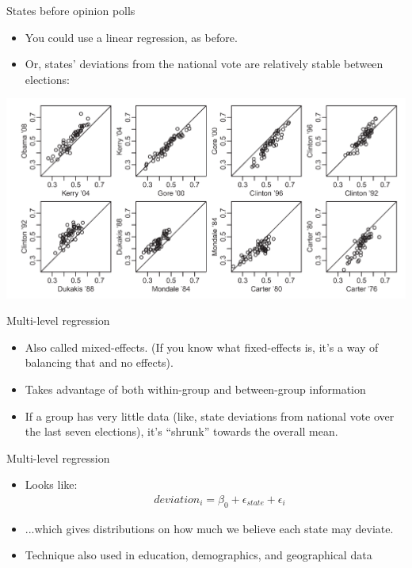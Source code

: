 \documentclass[14pt, t]{beamer}
\begin{document}
\begin{frame}{States before opinion polls}
\begin{itemize}
	\item You could use a linear regression, as before.
	\item Or, states' deviations from the national vote are relatively stable between elections:
\end{itemize}
	\begin{center}
	\includegraphics[width=\textwidth]{statestability.png}
	\end{center}
\end{frame}

\begin{frame}{Multi-level regression}
\begin{itemize}
	\item Also called mixed-effects. (If you know what fixed-effects is, it's a way of balancing that and no effects).
	\item Takes advantage of both within-group and between-group information
	\item If a group has very little data (like, state deviations from national vote over the last seven elections), it's ``shrunk'' towards the overall mean.
\end{itemize}
\end{frame}

\begin{frame}{Multi-level regression}
\begin{itemize}
	\item Looks like: \begin{align*}
		&deviation_i = \beta_0 + \epsilon_{state} + \epsilon_i
	\end{align*}
	\item ...which gives distributions on how much we believe each state may deviate.
	\item Technique also used in education, demographics, and geographical data
\end{itemize}
\end{frame}
\end{document}

